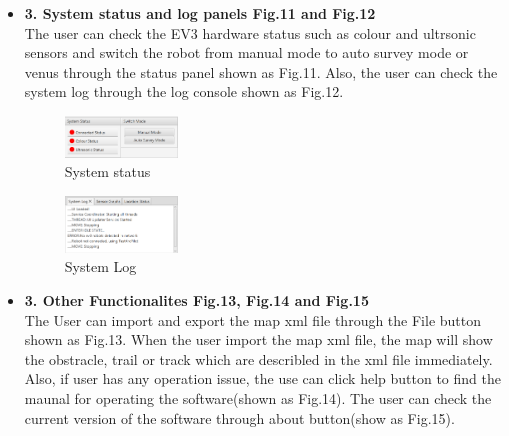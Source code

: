 \begin{itemize}
\item \textbf{3. System status and log panels Fig.11 and Fig.12}\\
The user can check the EV3 hardware status such as colour and ultrsonic sensors and switch the robot from manual mode to auto survey mode or venus through the status panel shown as Fig.11. Also, the user can check the system log through the log console shown as Fig.12.

\begin{figure}[H]
	\includegraphics[width=30mm]{Systemstatus.PNG}  
	\caption{System status}
	\label{fig:System Status}				
\end{figure}

\begin{figure}[H]
	\includegraphics[width=30mm]{SystemLog.PNG}  
	\caption{System Log}
	\label{fig:System Log}				
\end{figure}

\item \textbf{3. Other Functionalites Fig.13, Fig.14 and Fig.15}\\
The User can import and export the map xml file through the File button shown as Fig.13. When the user import the map xml file, the map will show the obstracle, trail or track which are describled in the xml file immediately. Also, if user has any operation issue, the use can click help button to find the maunal for operating the software(shown as Fig.14). The user can check the current version of the software through about button(show as Fig.15).



\end{itemize}
